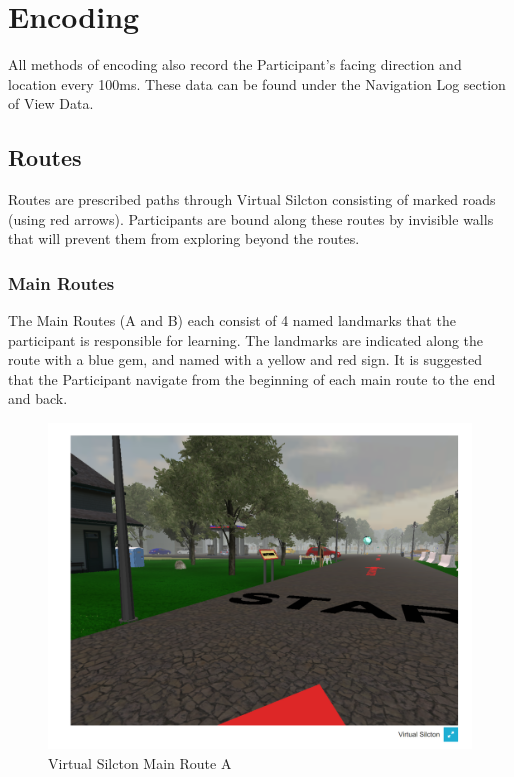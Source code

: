 \documentclass[
  12pt,
]{book}
\begin{document}
\hypertarget{encoding}{%
\section{Encoding}\label{encoding}}

All methods of encoding also record the Participant's facing direction and location every 100ms. These data can be found under the Navigation Log section of View Data.

\hypertarget{routes}{%
\subsection{Routes}\label{routes}}

Routes are prescribed paths through Virtual Silcton consisting of marked roads (using red arrows). Participants are bound along these routes by invisible walls that will prevent them from exploring beyond the routes.

\hypertarget{main-routes}{%
\subsubsection{Main Routes}\label{main-routes}}

The Main Routes (A and B) each consist of 4 named landmarks that the participant is responsible for learning. The landmarks are indicated along the route with a blue gem, and named with a yellow and red sign. It is suggested that the Participant navigate from the beginning of each main route to the end and back.

\begin{figure}
\centering
\includegraphics{./figs/Route_A.png}
\caption{Virtual Silcton Main Route A}
\end{figure}
\end{document}
